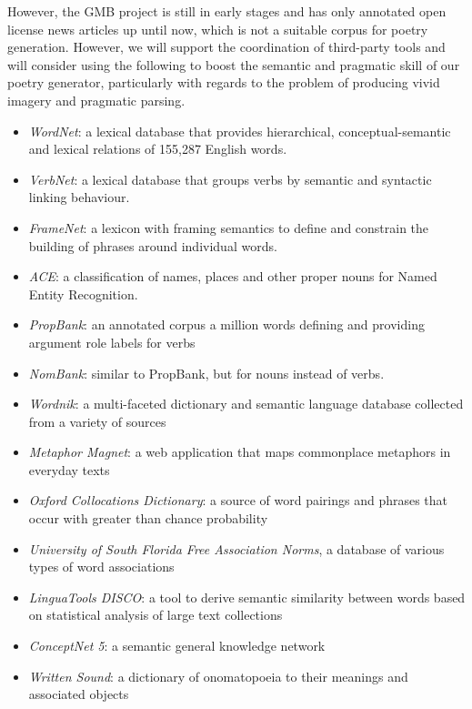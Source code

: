 However, the GMB project is still in early stages and has only annotated open license news articles up until now, which is not a suitable corpus for poetry generation. However, we will support the coordination of third-party tools and will consider using the following to boost the semantic and pragmatic skill of our poetry generator, particularly with regards to the problem of producing vivid imagery and pragmatic parsing.
\begin{itemize}
\item{\textit{WordNet}: a lexical database that provides hierarchical, conceptual-semantic and lexical relations of 155,287 English words.\cite{miller1995wordnet}}
\item{\textit{VerbNet}: a lexical database that groups verbs by semantic and syntactic linking behaviour.\cite{schuler2005verbnet}}
\item{\textit{FrameNet}: a lexicon with framing semantics to define and constrain the building of phrases around individual words.\cite{baker1998berkeley}}
\item{\textit{ACE}: a classification of names, places and other proper nouns for Named Entity Recognition.\cite{doddington2004automatic}}
\item{\textit{PropBank}: an annotated corpus a million words defining and providing argument role labels for verbs\cite{kingsbury2002treebank}}
\item{\textit{NomBank}: similar to PropBank, but for nouns instead of verbs.\cite{meyers2004nombank}}
\item{\textit{Wordnik}: a multi-faceted dictionary and semantic language database collected from a variety of sources\cite{wordnik}}
\item{\textit{Metaphor Magnet}: a web application that maps commonplace metaphors in everyday texts\cite{vealespecifying}}
\item{\textit{Oxford Collocations Dictionary}: a source of word pairings and phrases that occur with greater than chance probability\cite{crowther2003oxford}}
\item{\textit{University of South Florida Free Association Norms}, a database of various types of word associations\cite{nelson2004university}}
\item{\textit{LinguaTools DISCO}: a tool to derive semantic similarity between words based on statistical analysis of large text collections\cite{kolb2008disco}}
\item{\textit{ConceptNet 5}: a semantic general knowledge network\cite{liu2004conceptnet}}
\item{\textit{Written Sound}: a dictionary of onomatopoeia to their meanings and associated objects\cite{onomat}}
\end{itemize}


